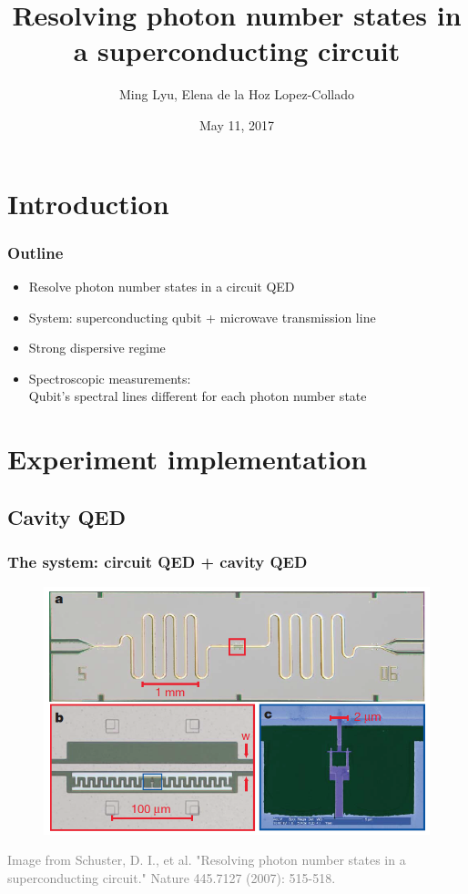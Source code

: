 \documentclass[xcolor=dvipsnames,hyperref={CJKbookmarks=true}]{beamer}
\title[Nature 445, 515-518]{Resolving photon number states in a superconducting circuit}
\author[Ming, Elena]{Ming Lyu, Elena de la Hoz Lopez-Collado}
\institute[Princeton]{Final projects for ELE456 at Princeton}
\date{May 11, 2017}
\begin{document}
\begin{frame}
\titlepage
\end{frame}
\begin{frame}
    \tableofcontents
\end{frame}

\section{Introduction} 
    


\begin{frame}
\frametitle{Outline}
\begin{itemize}
\item Resolve photon number states in a circuit QED
\vspace{0.3cm}
\item System: superconducting qubit +  microwave transmission line
\vspace{0.3cm}
\item Strong dispersive regime
\vspace{0.3cm}
\item Spectroscopic measurements: \\
Qubit's spectral lines different for each photon number state
\end{itemize}
\end{frame}

\section{Experiment implementation}

\subsection{Cavity QED}
\begin{frame}
\frametitle{The system: circuit QED + cavity QED}
\begin{figure}
\centering
\includegraphics[width=0.8\linewidth]{Circuit.png}
\end{figure}
\tiny{\textcolor{gray}{Image from Schuster, D. I., et al. "Resolving photon number states in a superconducting circuit." Nature 445.7127 (2007): 515-518.\cite{schuster2007resolving}}}
\end{frame}
\end{document}

